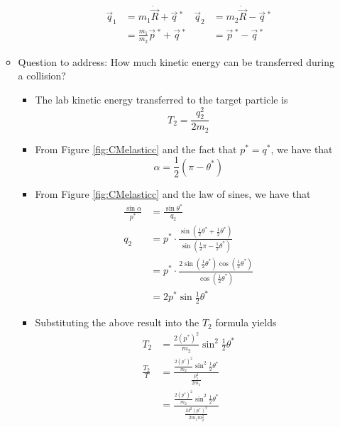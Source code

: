 \documentclass[../notes.tex]{subfiles}
\begin{document}
\begin{itemize}
\begin{itemize}
\begin{itemize}
            \begin{align*}
                \vec{q}_1 &= m_1\dot{\vec{R}}+\vec{q}{\,}^*&
                    \vec{q}_2 &= m_2\dot{\vec{R}}-\vec{q}{\,}^*\\
                &= \frac{m_1}{m_2}\vec{p}{\,}^*+\vec{q}{\,}^*&
                    &= \vec{p}{\,}^*-\vec{q}{\,}^*
            \end{align*}
        \end{itemize}
        \item Question to address: How much kinetic energy can be transferred during a collision?
        \begin{itemize}
            \item The lab kinetic energy transferred to the target particle is
            \begin{equation*}
                T_2 = \frac{q_2^2}{2m_2}
            \end{equation*}
            \item From Figure \ref{fig:CMelasticc} and the fact that $p^*=q^*$, we have that
            \begin{equation*}
                \alpha = \frac{1}{2}(\pi-\theta^*)
            \end{equation*}
            \item From Figure \ref{fig:CMelasticc} and the law of sines, we have that
            \begin{align*}
                \frac{\sin\alpha}{p^*} &= \frac{\sin\theta^*}{q_2}\\
                q_2 &= p^*\cdot\frac{\sin(\frac{1}{2}\theta^*+\frac{1}{2}\theta^*)}{\sin(\frac{1}{2}\pi-\frac{1}{2}\theta^*)}\\
                &= p^*\cdot\frac{2\sin(\frac{1}{2}\theta^*)\cos(\frac{1}{2}\theta^*)}{\cos(\frac{1}{2}\theta^*)}\\
                &= 2p^*\sin\frac{1}{2}\theta^*
            \end{align*}
            \item Substituting the above result into the $T_2$ formula yields
            \begin{align*}
                T_2 &= \frac{2(p^*)^2}{m_2}\sin^2\frac{1}{2}\theta^*\\
                \frac{T_2}{T} &= \frac{\frac{2(p^*)^2}{m_2}\sin^2\frac{1}{2}\theta^*}{\frac{p_1^2}{2m_1}}\\
                &= \frac{\frac{2(p^*)^2}{m_2}\sin^2\frac{1}{2}\theta^*}{\frac{M^2(p^*)^2}{2m_1m_2^2}}\\

\end{align*}
\end{itemize}
\end{itemize}
\end{itemize}
\end{document}
